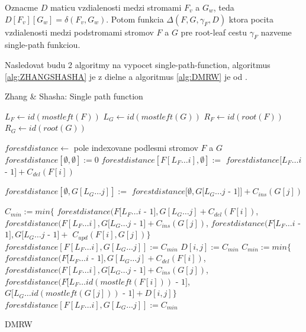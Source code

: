 \begin{definice}\label{def:single_path_function}
  Oznacme $D$ maticu vzdialenosti medzi stromami $F_{v}$ a $G_{w}$,
  teda $D[F_{v}][G_{w}] = \delta(F_{v}, G_{w})$.
  Potom funkcia $\Delta(F, G, \gamma_{F}, D)$ ktora pocita vzdialenosti medzi podstromami
  stromov $F$ a $G$ pre root-leaf cestu $\gamma_{F}$ nazveme single-path funkciou.
\end{definice}

Nasledovat budu 2 algoritmy na vypocet single-path-function, algoritmus \ref{alg:ZHANGSHASHA}
je z dielne \citet{ZHANGSHASHA} a algoritmus \ref{alg:DMRW} je od \citet{DMRW}.


\begin{algorithm}
  \caption{Zhang \& Shasha: Single path function}
  \label{alg:ZHANGSHASHA}
  \begin{algorithmic}[1]
      \State $L_{F} \gets id(mostleft(F))$
      \State $L_{G} \gets id(mostleft(G))$
      \State $R_{F} \gets id(root(F))$
      \State $R_{G} \gets id(root(G))$

      \State $forestdistance \gets$ pole indexovane podlesmi stromov $F$ a $G$
      \State $forestdistance[\emptyset, \emptyset] := 0$
        \State $forestdistance[F[L_{F} \dotsc i], \emptyset] :=$
        \Indent
          \State $forestdistance[L_{F} \dotsc i$ - $1] + C_{del}(F[i])$
        \EndIndent
      \EndFor

        \State $forestdistance[\emptyset, G[L_{G} \dotsc j]] :=$
        \Indent
          \State $forestdistance[\emptyset, G[L_{G} \dotsc j$ - $1]] + C_{ins}(G[j])$
        \EndIndent
      \EndFor

            \State $C_{min} := min \{$
            \Indent
              \State $forestdistance(F[L_{F} \dotsc i$ - $1], G[L_{G} \dotsc j] + C_{del}(F[i])$,
              \State $forestdistance(F[L_{F} \dotsc i], G[L_{G} \dotsc j$ - $1] + C_{ins}(G[j])$,
              \State $forestdistance(F[L_{F} \dotsc i$ - $1], G[L_{G} \dotsc j$ - $1] +$
              \Indent
                \State $C_{upd}(F[i], G[j]) \}$
              \EndIndent
            \EndIndent
            \State $forestdistance[F[L_{F} \dotsc i], G[L_{G} \dotsc j]] := C_{min}$
            \State $D[i, j] := C_{min}$
          \Else
            \State $C_{min} := min \{$
            \Indent
              \State $forestdistance(F[L_{F} \dotsc i$ - $1], G[L_{G} \dotsc j] + C_{del}(F[i])$,
              \State $forestdistance(F[L_{F} \dotsc i], G[L_{G} \dotsc j$ - $1] + C_{ins}(G[j])$,
              \State $forestdistance(F[L_{F} \dotsc id(mostleft(F[i]))$ - $1]$,
              \Indent
                \State $G[L_{G} \dotsc id(mostleft(G[j]))$ - $1] + D[i, j] \}$
              \EndIndent
            \EndIndent
            \State $forestdistance[F[L_{F} \dotsc i], G[L_{G} \dotsc j]] := C_{min}$
          \EndIf
        \EndFor
      \EndFor
    \EndProcedure
  \end{algorithmic}
\end{algorithm}

\begin{algorithm}
  \caption{DMRW}
  \label{alg:DMRW}
\end{algorithm}




